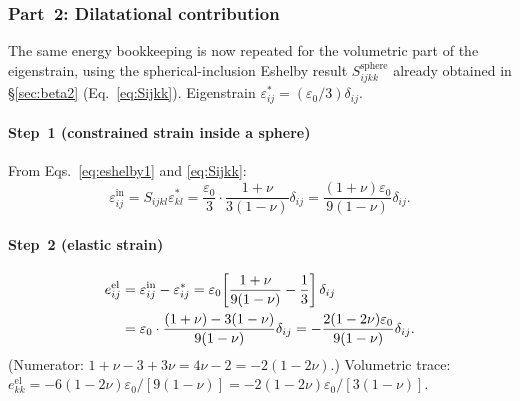 \documentclass[3p]{elsarticle}
\begin{document}
\subsubsection{Part~2: Dilatational contribution}
\label{sec:Edilat}

The same energy bookkeeping is now repeated for the volumetric part
of the eigenstrain, using the spherical-inclusion Eshelby result
$S_{ijkk}^\text{sphere}$ already obtained in
\S\ref{sec:beta2} (Eq.~\eqref{eq:Sijkk}).
Eigenstrain $\varepsilon^*_{ij}=(\varepsilon_0/3)\delta_{ij}$.

\paragraph{Step~1 (constrained strain inside a sphere)}
From Eqs.~\eqref{eq:eshelby1} and \eqref{eq:Sijkk}:
\begin{equation}
  \varepsilon_{ij}^\mathrm{in}=S_{ijkl}\varepsilon^*_{kl}
  =\frac{\varepsilon_0}{3}\cdot\frac{1+\nu}{3(1-\nu)}\delta_{ij}
  =\frac{(1+\nu)\varepsilon_0}{9(1-\nu)}\delta_{ij}.
  \label{eq:constrained_dil}
\end{equation}

\paragraph{Step~2 (elastic strain)}
\begin{align}
  e_{ij}^\mathrm{el}&=\varepsilon_{ij}^\mathrm{in}-\varepsilon^*_{ij}
    =\varepsilon_0\!\left[\frac{1+\nu}{9(1-\nu)}-\frac{1}{3}\right]\delta_{ij}
    \notag\\
  &=\varepsilon_0\cdot\frac{(1+\nu)-3(1-\nu)}{9(1-\nu)}\delta_{ij}
    =-\frac{2(1-2\nu)\varepsilon_0}{9(1-\nu)}\delta_{ij}.
    \label{eq:edilelastic}
\end{align}
(Numerator: $1+\nu-3+3\nu=4\nu-2=-2(1-2\nu)$.)
Volumetric trace:
$e_{kk}^\mathrm{el}=-6(1-2\nu)\varepsilon_0/[9(1-\nu)]
=-2(1-2\nu)\varepsilon_0/[3(1-\nu)]$.
\end{document}
